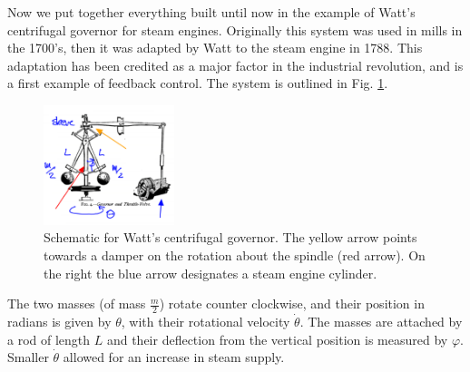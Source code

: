 \begin{ex}
	Now we put together everything built until now in the example of Watt's centrifugal governor for steam engines. Originally this system was used in mills in the 1700's, then it was adapted by Watt to the steam engine in 1788. This adaptation has been credited as a major factor in the industrial revolution, and is a first example of feedback control. The system is outlined in Fig. \ref{fig:governor}.
\begin{figure}[h!]
	\centering
	\includegraphics[width=0.34\textwidth]{figures/ch2/20governor.png}
	\caption{Schematic for Watt's centrifugal governor. The yellow arrow points towards a damper on the rotation about the spindle (red arrow). On the right the blue arrow designates a steam engine cylinder.}
	\label{fig:governor}
\end{figure}
The two masses (of mass $\frac{m}{2}$) rotate counter clockwise, and their position in radians is given by $\theta$, with their rotational velocity $\dot{\theta}$. The masses are attached by a rod of length $L$ and their deflection from the vertical position is measured by $\varphi$. Smaller $\dot{\theta}$ allowed for an increase in steam supply.


\end{ex}
